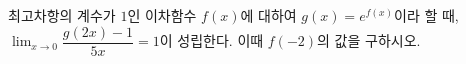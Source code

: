 최고차항의 계수가 $1$인 이차함수 $f(x)$에 대하여 $g(x)=e^{f(x)}$이라 할 때, $\displaystyle\lim_{x\to 0}\dfrac{g(2x)-1}{5x}=1$이 성립한다. 이때 $f(-2)$의 값을 구하시오.
